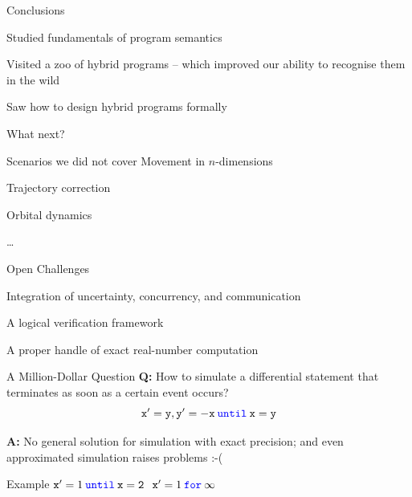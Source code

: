 \documentclass{beamer}
\newcommand{\blue}[1]{\textcolor{blue}{#1}}
\begin{document}
\begin{frame}{Conclusions}

        Studied fundamentals of program semantics

        Visited a zoo of hybrid programs -- which improved our ability to
        recognise them in the wild

        Saw how to design hybrid programs \alert{formally}

        \vspace{0.5cm}
        \pause
        What next?
\end{frame}

\begin{frame}{Scenarios we did not cover}
        Movement in $n$-dimensions

        Trajectory correction

        Orbital dynamics

        \dots
\end{frame}

\begin{frame}{Open Challenges}

        Integration of uncertainty, concurrency, and communication

        A logical verification framework

        A proper handle of exact real-number computation
\end{frame}

\begin{frame}{A Million-Dollar Question}
        \textbf{Q:} How to simulate a differential statement that
        \alert{terminates as soon as} a certain \alert{event} occurs?  
        \[
                \mathtt{x}' = \mathtt{y}, \mathtt{y}' = -\mathtt{x} \> \mathtt{\blue{until}} 
                \> \mathtt{x = y}
        \]

        \textbf{A:} No general solution for simulation with \alert{exact
        precision}; and even approximated simulation raises problems :-( 
        \begin{block}{Example}
                $\mathtt{x}' = 1 \> \mathtt{\blue{until}} \> \mathtt{x = 2}  \>$
                  \>
                $\mathtt{x}' = 1 \> \mathtt{\blue{for}} \> \mathtt{\infty}$
        \end{block}
\end{frame}
\end{document}
